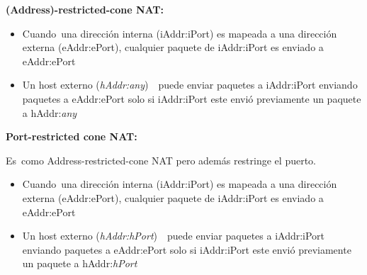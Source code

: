 \documentclass{article}
\begin{document}
\vspace{\baselineskip}
\begin{flushleft}
	{\fontsize{14pt}{16.8pt}\selectfont \textbf{(Address)-restricted-cone NAT:}\par}
\end{flushleft}\par

\begin{itemize}
	\item Cuando\ una dirección interna (iAddr:iPort) es mapeada a una dirección externa (eAddr:ePort), cualquier paquete de iAddr:iPort es enviado a eAddr:ePort  \par
	
	
	\vspace{\baselineskip}
	\setlength{\parskip}{0.96pt}
	\item{Un host externo (\textit{hAddr:any})\ \ puede enviar paquetes a iAddr:iPort enviando paquetes a eAddr:ePort solo si iAddr:iPort este envió previamente un paquete a  hAddr:\textit{any}}
\end{itemize}\par


\vspace{\baselineskip}

\vspace{\baselineskip}

\vspace{\baselineskip}
\begin{flushleft}
	{\fontsize{14pt}{16.8pt}\selectfont \textbf{Port-restricted cone NAT:}\par}
\end{flushleft}\par

\begin{flushleft}
	 Es\ como Address-restricted-cone NAT  pero además restringe el puerto.
\end{flushleft}\par

\setlength{\parskip}{0.0pt}
\begin{itemize}
	\item Cuando\ una dirección interna (iAddr:iPort) es mapeada a una dirección externa (eAddr:ePort), cualquier paquete de iAddr:iPort es enviado a eAddr:ePort  \par
	
	\setlength{\parskip}{0.96pt}
	\item {Un host externo (\textit{hAddr:hPort})\ \ puede enviar paquetes a iAddr:iPort enviando paquetes a eAddr:ePort solo si iAddr:iPort este envió previamente un paquete a  hAddr:\textit{hPort}}
\end{itemize}\par
\end{document}
